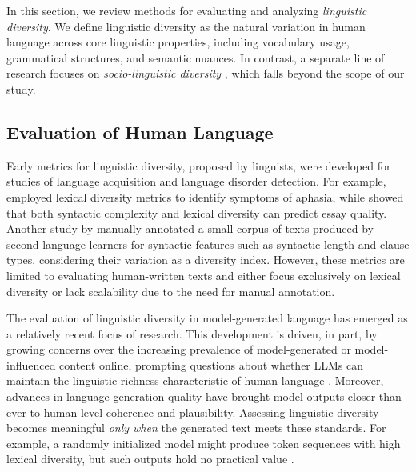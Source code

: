 \documentclass[11pt,a4paper]{article}
\begin{document}
In this section, we review methods for evaluating and analyzing \textit{linguistic diversity}. We define linguistic diversity as the natural variation in human language across core linguistic properties, including vocabulary usage, grammatical structures, and semantic nuances. In contrast, a separate line of research focuses on \textit{socio-linguistic diversity} \citep{hayati2023far, lahoti-etal-2023-improving}, which falls beyond the scope of our study.





\subsection{Evaluation of Human Language} \label{subsec:human}
Early metrics for linguistic diversity, proposed by linguists, were developed for studies of language acquisition and language disorder detection. For example, \citet{fergadiotis2013measuring} employed lexical diversity metrics to identify symptoms of aphasia, while \citet{mcnamara2010linguistic} showed that both syntactic complexity and lexical diversity can predict essay quality.		
Another study by \citet{a89efe5d-217a-3260-b2b1-1437ae204234} manually annotated a small corpus of texts produced by second language learners for syntactic features such as syntactic length and clause types, considering their variation as a diversity index. 
However, these metrics are limited to evaluating human-written texts and either focus exclusively on lexical diversity or lack scalability due to the need for manual annotation.	

The evaluation of linguistic diversity in model-generated language has emerged as a relatively recent focus of research. This development is driven, in part, by growing concerns over the increasing prevalence of model-generated or model-influenced content online, prompting questions about whether LLMs can maintain the linguistic richness characteristic of human language \citep{guo-etal-2024-curious}. Moreover, advances in language generation quality have brought model outputs closer than ever to human-level coherence and plausibility. Assessing linguistic diversity becomes meaningful \textit{only when} the generated text meets these standards. For example, a randomly initialized model might produce token sequences with high lexical diversity, but such outputs hold no practical value \citep{uchendu2023does}.	
\end{document}
